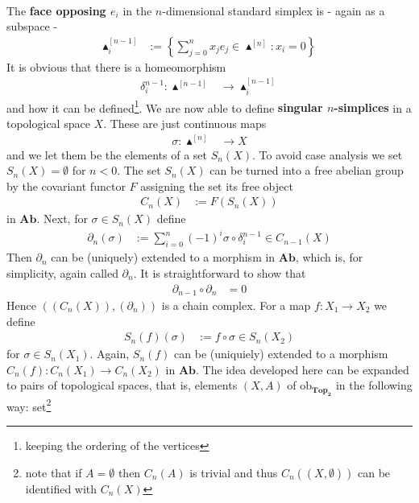 \\
The \textbf{face opposing $e_{i}$} in the $n$-dimensional standard simplex is - again as a subspace -
\begin{align*}
  \blacktriangle_{i}^{[n-1]}
  &:=
  \left\lbrace
      \sum_{j=0}^{n}
      x_{j}e_{j}
      \in
      \blacktriangle^{[n]}
    \colon
      x_{i}
      =
      0
  \right\rbrace
\end{align*}
It is obvious that there is a homeomorphism
\begin{align*}
  \delta_{i}^{n-1}
  \colon
  \blacktriangle^{[n-1]}
  &\to
  \blacktriangle_{i}^{[n-1]}
\end{align*}
and how it can be defined\footnote{keeping the ordering of the vertices}. We are now able to define \textbf{singular $n$-simplices} in a topological space $X$. These are just continuous maps
\begin{align*}
  \sigma
  \colon
  \blacktriangle^{[n]}
  &\to
  X
\end{align*}
and we let them be the elements of a set $S_{n}(X)$. To avoid case analysis we set $S_{n}(X) = \emptyset$ for $n < 0$. The set $S_{n}(X)$ can be turned into a free abelian group by the covariant functor $F$ assigning the set its free object
\begin{align*}
  C_{n}(X)
  &:=
  F(S_{n}(X))
\end{align*}
in $\mathbf{Ab}$. Next, for $\sigma \in S_{n}(X)$ define
\begin{align*}
  \partial_{n}(\sigma)
  &:=
  \sum_{i=0}^{n}
  (-1)^{i}
  \sigma
  \circ
  \delta_{i}^{n-1}
  \in
  C_{n-1}(X)
\end{align*}
Then $\partial_{n}$ can be (uniquely) extended to a morphism in $\mathbf{Ab}$, which is, for simplicity, again called $\partial_{n}$. It is straightforward to show that
\begin{align*}
  \partial_{n-1}
  \circ
  \partial_{n}
  &=
  0
\end{align*}
Hence $((C_{n}(X)),(\partial_{n}))$ is a chain complex. For a map $f \colon X_{1} \to X_{2}$ we define
\begin{align*}
  S_{n}(f)(\sigma)
  &:=
  f
  \circ
  \sigma
  \in S_{n}(X_{2})
\end{align*}
for $\sigma \in S_{n}(X_{1})$. Again, $S_{n}(f)$ can be (uniquiely) extended to a morphism $C_{n}(f) \colon C_{n}(X_{1}) \to C_{n}(X_{2})$ in $\mathbf{Ab}$. The idea developed here can be expanded to pairs of topological spaces, that is, elements $(X,A)$ of $\mathrm{ob}_{\mathbf{Top_{2}}}$ in the following way: set\footnote{note that if $A = \emptyset$ then $C_{n}(A)$ is trivial and thus $C_{n}((X,\emptyset))$ can be identified with $C_{n}(X)$}

